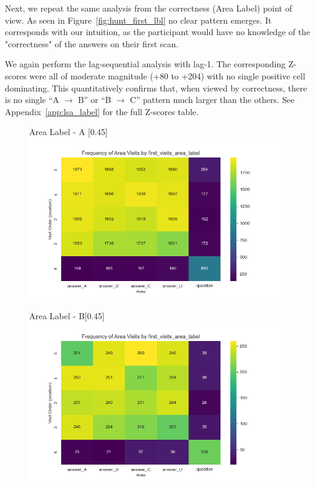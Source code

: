 \documentclass{article}
\begin{document}
        Next, we repeat the same analysis from the correctness (Area Label) point of view. As seen in Figure~\ref{fig:hunt_first_lbl} no clear pattern emerges. It corresponds with our intuition, as the participant would have no knowledge of the "correctness" of the answers on their first scan.

        We again perform the lag-sequential analysis with lag-1. The corresponding Z-scores were all of moderate magnitude (+80 to +204) with no single positive cell dominating. This quantitatively confirms that, when viewed by correctness, there is no single “A $\to$ B” or “B $\to$ C” pattern much larger than the others.  See Appendix~\ref{app:lsa_label} for the full Z-scores table.
        
        \begin{figure}[H]
          \centering
          \begin{subcaptionbox}{Area Label - A \label{fig:aa}}[0.45\textwidth]
            {\centering\includegraphics[width=\linewidth]{plots/visits/matrix__first_visits_area_label_hunters_A.png}}
          \end{subcaptionbox}
          \hfill
          \begin{subcaptionbox}{Area Label - B\label{fig:bb}}[0.45\textwidth]
            {\centering\includegraphics[width=\linewidth]{plots/visits/matrix__first_visits_area_label_hunters_B.png}}
          \end{subcaptionbox}
          

\end{figure}
\end{document}

